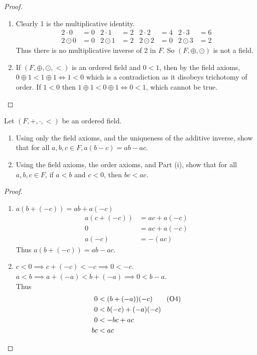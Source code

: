 \documentclass[12pt]{article}
\begin{document}
\begin{proof}
    \begin{enumerate}[label=(\alph*)]
        \item Clearly 1 is the multiplicative identity.
            \begin{align*}
                2 \cdot 0 &= 0 & 2 \cdot 1 &= 2 & 2 \cdot 2 &= 4 & 2 \cdot 3 &= 6 \\
                2 \odot 0 &= 0 & 2 \odot 1 &= 2 & 2 \odot 2 &= 0 & 2 \odot 3 &= 2
            \end{align*}
            Thus there is no multiplicative inverse of 2 in $F$. So $(F, \oplus, \odot)$ is not a field.
        \item
            If $(F, \oplus, \odot, <)$ is an ordered field and $0 < 1$, then by the field axioms, $0 \oplus 1 < 1 \oplus 1 \iff 1 < 0$ which is a contradiction as it disobeys trichotomy of order. If $1 < 0$ then $1 \oplus 1 < 0 \oplus 1 \iff 0 < 1$, which cannot be true. \qedhere
    \end{enumerate}
\end{proof}

\begin{problem}
    Let $(F, +, \cdot, <)$ be an ordered field.
    \begin{enumerate}[label=(\textit{\roman*})]
        \item Using only the field axioms, and the uniqueness of the additive inverse, show that for all $a, b, c \in F, a(b - c) = ab - ac$.
        \item Using the field axioms, the order axioms, and Part (i), show that for all $a, b, c \in F$, if $a < b$ and $c < 0$, then $bc < ac$.
    \end{enumerate}
\end{problem}
\begin{proof}
    \begin{enumerate}[label=(\textit{\roman*})]
        \item $a(b + (-c)) = ab + a(-c)$
        \begin{align*}
            a(c + (-c)) &= ac + a(-c) \\
            0 &= ac + a(-c) \\
            a(-c) &= -(ac)
        \end{align*}
        Thus $a(b + (-c)) = ab - ac$.

        \item $c < 0 \implies c + (-c) < -c \implies 0 < -c$. \\
        $a < b \implies a + (-a) < b + (-a) \implies 0 < b - a$. \\
        Thus
        \begin{align*}
             0 &< (b + (-a))(-c) \tag{O4} \\
             0 &< b(-c) + (-a)(-c) \\
             0 &< -bc + ac \\
            bc &< ac \qedhere
        \end{align*}
    \end{enumerate}
\end{proof}
\end{document}
